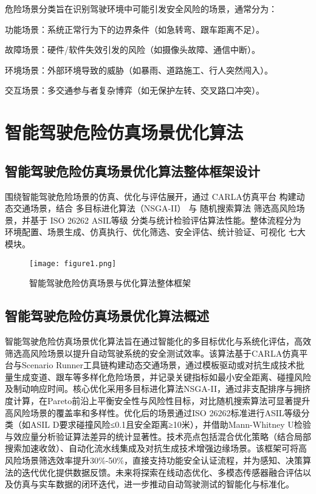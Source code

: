 危险场景分类旨在识别驾驶环境中可能引发安全风险的场景，通常分为：

功能场景：系统正常行为下的边界条件（如急转弯、跟车距离不足）。

故障场景：硬件/软件失效引发的风险（如摄像头故障、通信中断）。

环境场景：外部环境导致的威胁（如暴雨、道路施工、行人突然闯入）。

交互场景：多交通参与者复杂博弈（如无保护左转、交叉路口冲突）。






\chapter{智能驾驶危险仿真场景优化算法}
\section{智能驾驶危险仿真场景优化算法整体框架设计}

围绕智能驾驶危险场景的仿真、优化与评估展开，通过 CARLA仿真平台 构建动态交通场景，结合 多目标进化算法（NSGA-II） 与 随机搜索算法 筛选高风险场景，并基于 ISO 26262 ASIL等级 分类与统计检验评估算法性能。整体流程分为 环境配置、场景生成、仿真执行、优化筛选、安全评估、统计验证、可视化 七大模块。

\begin{figure}[htbp]
	\centering
	\texttt{[image: figure1.png]} %
	\caption{智能驾驶危险仿真场景与优化算法整体框架} %
	\label{fig:example} %
\end{figure}


\section{智能驾驶危险仿真场景优化算法概述}

智能驾驶危险仿真场景优化算法旨在通过智能化的多目标优化与系统化评估，高效筛选高风险场景以提升自动驾驶系统的安全测试效率。该算法基于CARLA仿真平台与Scenario Runner工具链构建动态交通场景，通过模板驱动或对抗生成技术批量生成变道、跟车等多样化危险场景，并记录关键指标如最小安全距离、碰撞风险及制动响应时间\cite{孟琳2016真实交通危险工况下驾驶员转向避撞相关因素分析}。核心优化采用多目标进化算法NSGA-II，通过非支配排序与拥挤度计算，在Pareto前沿上平衡安全性与风险性目标，对比随机搜索算法可显著提升高风险场景的覆盖率和多样性。优化后的场景通过ISO 26262标准进行ASIL等级分类（如ASIL D要求碰撞风险≤0.1且安全距离≥10米），并借助Mann-Whitney U检验与效应量分析验证算法差异的统计显著性。技术亮点包括混合优化策略（结合局部搜索加速收敛）、自动化流水线集成及对抗生成技术增强边缘场景。该框架可将高风险场景筛选效率提升30\%-50\%，直接支持功能安全认证流程，并为感知、决策算法的迭代优化提供数据反馈。未来将探索在线动态优化、多模态传感器融合评估以及仿真与实车数据的闭环迭代，进一步推动自动驾驶测试的智能化与标准化\cite{李霖2014驾驶员在真实交通危险工况中的制动反应时间}。

